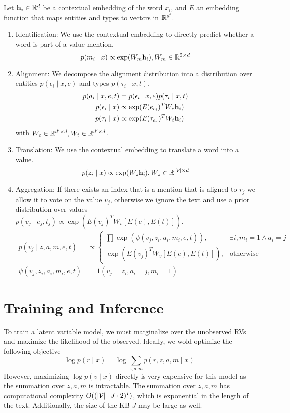\documentclass[12pt]{article}
\begin{document}
Let $\mathbf{h}_i \in \mathbb{R}^d$ be a contextual embedding of the word $x_i$,
and $E$ an embedding function that maps entities and types
to vectors in $\mathbb{R}^{d'}$.
\begin{enumerate}
\item Identification: We use the contextual embedding to directly predict
whether a word is part of a value mention.
$$p(m_i \mid x) \propto \exp(W_m\mathbf{h}_i), W_m \in \mathbb{R}^{2 \times d}$$
\item Alignment: We decompose the alignment distribution into a distribution over
entities $p(\epsilon_i \mid x,e)$ and types $p(\tau_i \mid x,t)$.
\begin{align*}
p(a_i \mid x,e,t) &= p(\epsilon_i \mid x,e)p(\tau_i \mid x,t)\\
p(\epsilon_i \mid x) &\propto \exp(E(e_{\epsilon_i})^T W_e \mathbf{h}_i)\\
p(\tau_i \mid x) &\propto \exp(E(\tau_{a_i})^T W_t \mathbf{h}_i)
\end{align*}
with $W_e \in \mathbb{R}^{d' \times d},W_t \in \mathbb{R}^{d' \times d}$.
\item Translation: We use the contextual embedding to translate a word
into a value.
$$p(z_i \mid x) \propto \exp(W_z \mathbf{h}_i), W_z \in \mathbb{R}^{|\mathcal{V}| \times d}$$
\item Aggregation:
If there exists an index that is a mention that is aligned to $r_j$
we allow it to vote on the value $v_j$, otherwise we ignore the text
and use a prior distribution over values $p(v_j \mid e_j, t_j) \propto \exp(E(v_j)^TW_v [E(e),E(t)])$.
\begin{align*}
p(v_j \mid z,a,m,e,t) &\propto \begin{cases}
    \prod \exp(\psi(v_j, z_i,a_i,m_i,e,t)),  & \exists i, m_i = 1 \wedge a_i = j\\
    \exp(E(v_j)^TW_v [E(e),E(t)]), & \textrm{otherwise}
\end{cases}\\
\psi(v_j, z_i, a_i, m_i,e,t) &= 1(v_j = z_i, a_i = j, m_i=1)%
\end{align*}
\end{enumerate}

\section{Training and Inference}
To train a latent variable model, we must marginalize over the unobserved RVs
and maximize the likelihood of the observed.
Ideally, we wold optimize the following objective
\begin{equation}
\log p(r \mid x) = \log \sum_{z,a,m} p(r,z,a,m \mid x)
\end{equation}
However, maximizing $\log p(v \mid x)$ directly is very expensive for this model
as the summation over $z,a,m$ is intractable.
The summation over $z,a,m$ has computational complexity $O((|\mathcal{V}|\cdot J\cdot 2)^{I})$,
which is exponential in the length of the text.
Additionally, the size of the KB $J$ may be large as well.
\end{document}
